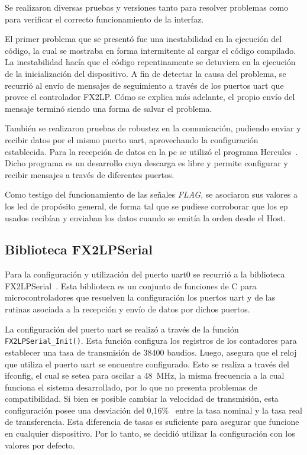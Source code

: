 
Se realizaron diversas pruebas y versiones tanto para resolver problemas como para verificar el correcto funcionamiento de la interfaz.

El primer problema que se presentó fue una inestabilidad en la ejecución del código, la cual se mostraba en forma intermitente al cargar el código compilado. La inestabilidad hacía que el código repentinamente se detuviera en la ejecución de la inicialización del dispositivo. A fin de detectar la causa del problema, se recurrió al envío de mensajes de seguimiento a través de los puertos \acrshort{uart} que provee el controlador FX2LP. Cómo se explica más adelante, el propio envío del mensaje terminó siendo una forma de salvar el problema.

También se realizaron pruebas de robustez en la comunicación, pudiendo enviar y recibir datos por el mismo puerto \acrshort{uart}, aprovechando la configuración establecida. Para la recepción de datos en la \acrshort{pc} se utilizó el programa Hercules~\cite{HWGroup}. Dicho programa es un desarrollo cuya descarga es libre y permite configurar y recibir mensajes a través de diferentes puertos.

Como testigo del funcionamiento de las señales \textit{FLAG}, se asociaron sus valores a los \acrshort{led} de propósito general, de forma tal que se pudiese corroborar que los \acrshort{ep} usados recibían y enviaban los datos cuando se emitía la orden desde el Host.

\subsection{Biblioteca FX2LPSerial}
Para la configuración y utilización del puerto \acrshort{uart}0 se recurrió a la biblioteca FX2LPSerial~\cite{Kumar2017}. Esta biblioteca es un conjunto de funciones de C para microcontroladores que resuelven la configuración los puertos \acrshort{uart} y de las rutinas asociada a la recepción y envío de datos por dichos puertos. 

La configuración del puerto \acrshort{uart} se realizó a través de la función \verb|FX2LPSerial_Init()|. Esta función configura los registros de los contadores para establecer una tasa de transmisión de 38400 baudios. Luego, asegura que el reloj que utiliza el puerto \acrshort{uart} se encuentre configurado. Esto se realiza a través del \acrshort{ifconfig}, el cual se setea para oscilar a \SI{48}{\mega\hertz}, la misma frecuencia a la cual funciona el sistema desarrollado, por lo que no presenta problemas de compatibilidad. Si bien es posible cambiar la velocidad de transmisión, esta configuración posee una desviación del 0,16\%~\cite{CypressSemiconductor2014fx2lp} entre la tasa nominal y la tasa real de transferencia. Esta diferencia de tasas es suficiente para asegurar que funcione en cualquier dispositivo. Por lo tanto, se decidió utilizar la configuración con los valores por defecto.


